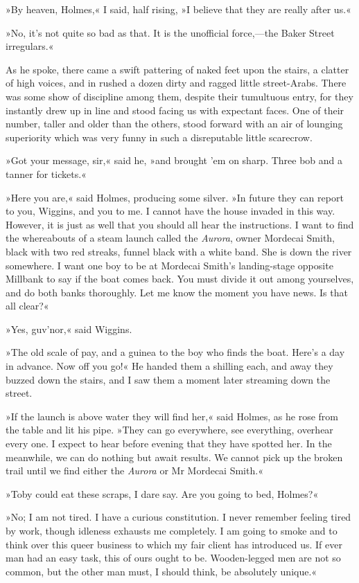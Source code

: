 »By heaven, Holmes,« I said, half rising, »I believe that they are really after us.«

»No, it's not quite so bad as that. It is the unofficial force,—the Baker Street irregulars.«

As he spoke, there came a swift pattering of naked feet upon the stairs, a clatter of high voices, and in rushed a dozen dirty and ragged little street-Arabs. There was some show of discipline among them, despite their tumultuous entry, for they instantly drew up in line and stood facing us with expectant faces. One of their number, taller and older than the others, stood forward with an air of lounging superiority which was very funny in such a disreputable little scarecrow.

»Got your message, sir,« said he, »and brought 'em on sharp. Three bob and a tanner for tickets.«

»Here you are,« said Holmes, producing some silver. »In future they can report to you, Wiggins, and you to me. I cannot have the house invaded in this way. However, it is just as well that you should all hear the instructions. I want to find the whereabouts of a steam launch called the \textit{Aurora}, owner Mordecai Smith, black with two red streaks, funnel black with a white band. She is down the river somewhere. I want one boy to be at Mordecai Smith's landing-stage opposite Millbank to say if the boat comes back. You must divide it out among yourselves, and do both banks thoroughly. Let me know the moment you have news. Is that all clear?«

»Yes, guv'nor,« said Wiggins.

»The old scale of pay, and a guinea to the boy who finds the boat. Here's a day in advance. Now off you go!« He handed them a shilling each, and away they buzzed down the stairs, and I saw them a moment later streaming down the street.

»If the launch is above water they will find her,« said Holmes, as he rose from the table and lit his pipe. »They can go everywhere, see everything, overhear every one. I expect to hear before evening that they have spotted her. In the meanwhile, we can do nothing but await results. We cannot pick up the broken trail until we find either the \textit{Aurora} or Mr Mordecai Smith.«

»Toby could eat these scraps, I dare say. Are you going to bed, Holmes?«

»No; I am not tired. I have a curious constitution. I never remember feeling tired by work, though idleness exhausts me completely. I am going to smoke and to think over this queer business to which my fair client has introduced us. If ever man had an easy task, this of ours ought to be. Wooden-legged men are not so common, but the other man must, I should think, be absolutely unique.«

